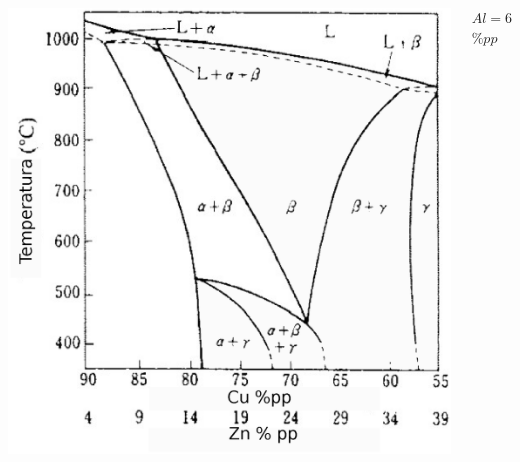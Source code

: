 \documentclass[usenames,dvipsnames]{beamer}
\begin{document}
\begin{frame}
\begin{columns}
\includegraphics[width=\columnwidth]{img/intro/CuZnAl.eps}
\begin{center}
\begin{small}
\quad $Al=6$ $\% pp$
\end{small}
\end{center}
\end{columns}
\end{frame}

\end{document}
